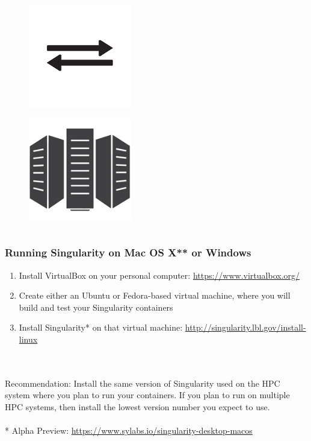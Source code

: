 \documentclass{beamer}
\begin{document}
\begin{frame}
\begin{columns}
\begin{column}{0.5\textwidth}
         \vspace{-3.0em}
         \begin{figure}[htbp]
            \includegraphics[width=0.4\textwidth]{images/file-transfer-arrows.png}
         \end{figure}
         \vspace{-3.0em}
         \begin{figure}[htbp]
            \includegraphics[width=0.4\textwidth]{images/supercomputer-icon.png}
         \end{figure}
      \end{column}
   \end{columns}
\end{frame}

\begin{frame}
   \frametitle{Running Singularity on Mac OS X** or Windows}
   \begin{enumerate}
      \setlength\itemsep{1.0em}
      \item Install VirtualBox on your personal computer: 
         \url{https://www.virtualbox.org/}
      \item Create either an Ubuntu or Fedora-based virtual machine, 
         where you will build and test your Singularity containers
      \item Install Singularity* on that virtual machine: 
         \url{http://singularity.lbl.gov/install-linux}
   \end{enumerate}
   \ \\ \ \\
   \footnotesize * Recommendation: Install the same version of 
      Singularity used on the HPC system where you plan to run your 
      containers. If you plan to run on multiple HPC systems, then 
      install the lowest version number you expect to use.
   \ \\ \ \\
   \footnotesize ** Alpha Preview: \url{https://www.sylabs.io/singularity-desktop-macos}

\end{frame}
\end{document}
